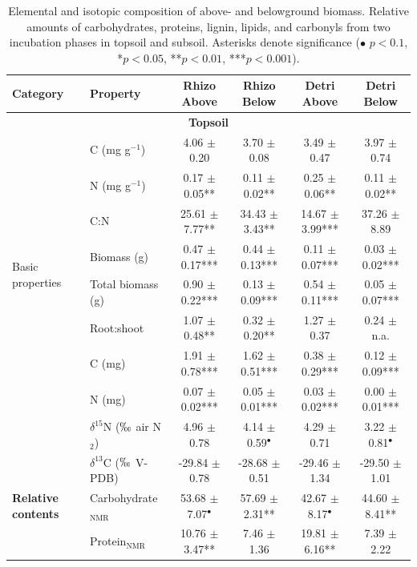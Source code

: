 \begin{table}[htbp]
  \centering
  \scriptsize
  \caption[Elemental and isotopic composition of above- and belowground biomass]{Elemental and isotopic composition of above- and belowground biomass. Relative amounts of carbohydrates, proteins, lignin, lipids, and carbonyls from two incubation phases in topsoil and subsoil. Asterisks denote significance ($\bullet$ $p < 0.1$, *$p < 0.05$, **$p < 0.01$, ***$p < 0.001$).}
  \begin{tabular}{llcccc}
  \toprule
  \textbf{Category} & \textbf{Property} & Rhizo Above & Rhizo Below & Detri Above & Detri Below \\
  \midrule
  \multicolumn{6}{c}{\textbf{Topsoil}} \\
  \midrule
  \multirow{8}{*}{Basic properties} & C (mg g$^{-1}$) & 4.06 $\pm$ 0.20 & 3.70 $\pm$ 0.08 & 3.49 $\pm$ 0.47 & 3.97 $\pm$ 0.74 \\
  & N (mg g$^{-1}$) & 0.17 $\pm$ 0.05** & 0.11 $\pm$ 0.02** & 0.25 $\pm$ 0.06** & 0.11 $\pm$ 0.02** \\
  & C:N & 25.61 $\pm$ 7.77** & 34.43 $\pm$ 3.43** & 14.67 $\pm$ 3.99*** & 37.26 $\pm$ 8.89 \\
  & Biomass (g) & 0.47 $\pm$ 0.17*** & 0.44 $\pm$ 0.13*** & 0.11 $\pm$ 0.07*** & 0.03 $\pm$ 0.02*** \\
  & Total biomass (g) & 0.90 $\pm$ 0.22*** & 0.13 $\pm$ 0.09*** & 0.54 $\pm$ 0.11*** & 0.05 $\pm$ 0.07*** \\
  & Root:shoot & 1.07 $\pm$ 0.48** & 0.32 $\pm$ 0.20** & 1.27 $\pm$ 0.37 & 0.24 $\pm$ n.a. \\
  & C (mg) & 1.91 $\pm$ 0.78*** & 1.62 $\pm$ 0.51*** & 0.38 $\pm$ 0.29*** & 0.12 $\pm$ 0.09*** \\
  & N (mg) & 0.07 $\pm$ 0.02*** & 0.05 $\pm$ 0.01*** & 0.03 $\pm$ 0.02*** & 0.00 $\pm$ 0.01*** \\
  & $\delta^{15}$N ($\permil$ air N$_2$) & 4.96 $\pm$ 0.78 & 4.14 $\pm$ 0.59$^{\bullet}$ & 4.29 $\pm$ 0.71 & 3.22 $\pm$ 0.81$^{\bullet}$ \\
  & $\delta^{13}$C ($\permil$ V-PDB) & -29.84 $\pm$ 0.78 & -28.68 $\pm$ 0.51 & -29.46 $\pm$ 1.34 & -29.50 $\pm$ 1.01 \\
  \midrule
  \textbf{Relative contents} & Carbohydrate$_{\text{NMR}}$ & 53.68 $\pm$ 7.07$^{\bullet}$ & 57.69 $\pm$ 2.31** & 42.67 $\pm$ 8.17$^{\bullet}$ & 44.60 $\pm$ 8.41** \\
  & Protein$_{\text{NMR}}$ & 10.76 $\pm$ 3.47** & 7.46 $\pm$ 1.36 & 19.81 $\pm$ 6.16** & 7.39 $\pm$ 2.22 \\

\end{tabular}
\end{table}
